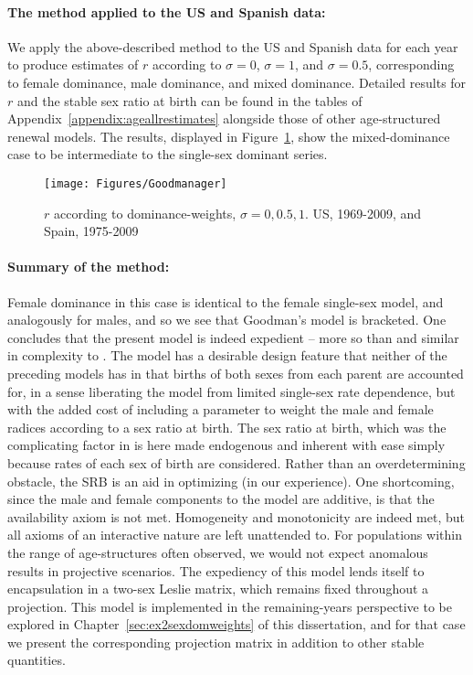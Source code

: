 \paragraph{The method applied to the US and Spanish data: } We apply the
above-described method to the US and Spanish data for each year to produce
estimates of $r$ according to $\sigma = 0$, $\sigma = 1$, and $\sigma = 0.5$,
corresponding to female dominance, male dominance, and mixed dominance. Detailed 
results for $r$ and the stable sex ratio at birth can be found in the tables of
Appendix~\ref{appendix:ageallrestimates} alongside those of other
age-structured renewal models. The
results, displayed in Figure~\ref{fig:Goodmanr}, show the mixed-dominance case
to be intermediate to the single-sex dominant series. 

\begin{figure}[ht!]
        \centering  
          \caption{$r$ according to dominance-weights, $\sigma = 0, 0.5, 1$.
          US, 1969-2009, and Spain, 1975-2009}
           \texttt{[image: Figures/Goodmanager]}
          \label{fig:Goodmanr}
\end{figure}

\paragraph{Summary of the method: }
Female dominance in this case is identical to the female single-sex model, and
analogously for males, and so we see that Goodman's model is bracketed. One concludes that the present
model is indeed expedient -- more so than \citet{mitra1978derivation} and
similar in complexity to \citet{pollard1948measurement}. The model has a desirable
design feature that neither of the preceding models has in that 
births of both sexes from each parent are accounted for, in a sense liberating
the model from limited single-sex rate dependence, but with the added cost of 
including a parameter to weight the male and female radices according 
to a sex ratio at birth. The sex ratio at birth, which was the complicating factor in
\citet{mitra1978derivation} is here made endogenous and inherent with ease
simply because rates of each sex of birth are considered. Rather than an
overdetermining obstacle, the SRB is an aid in optimizing (in our experience).
One shortcoming, since the male and female components to the model are
additive, is that the availability axiom is not met. Homogeneity and
monotonicity are indeed met, but all axioms of an interactive nature are left
unattended to. For populations within the range of age-structures often
observed, we would not expect anomalous results in projective scenarios. The
expediency of this model lends itself to encapsulation in a two-sex Leslie
matrix, which remains fixed throughout a projection. This model is
implemented in the remaining-years perspective to be explored in
Chapter~\ref{sec:ex2sexdomweights} of this dissertation, and for that case we
present the corresponding projection matrix in addition to other stable quantities.

\FloatBarrier
